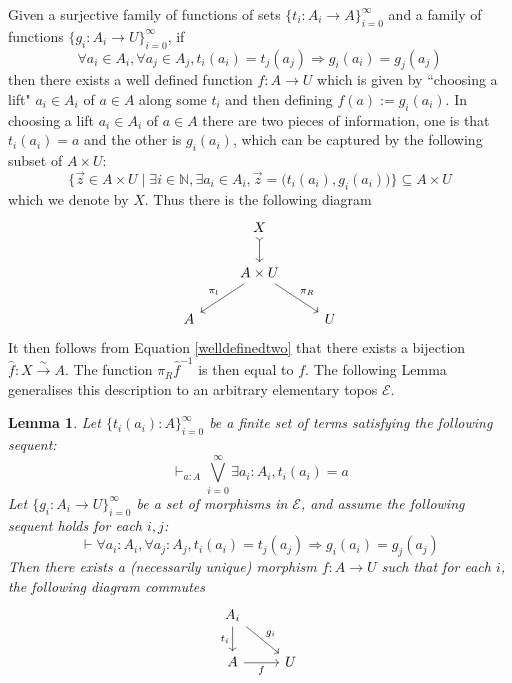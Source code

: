 \documentclass{birkjour}
\theoremstyle{plain}
\newtheorem{lemma}[thm]{Lemma}
\theoremstyle{definition}
\newcommand{\bb}[1]{\mathbb{#1}}
\newcommand{\call}[1]{\mathcal{#1}}
\begin{document}
Given a surjective family of functions of sets $\lbrace t_i: A_i \to A\rbrace_{i = 0}^\infty$ and a family of functions $\lbrace g_i: A_i \to U\rbrace_{i = 0}^\infty$, if
\begin{equation}
	\label{welldefinedtwo}
	\forall a_i \in A_i, \forall a_j \in A_j, t_i(a_i) = t_j(a_j) \Rightarrow g_i(a_i) = g_j(a_j)
\end{equation}
then there exists a well defined function $f: A \to U$ which is given by ``choosing a lift" $a_i \in A_i$ of $a \in A$ along some $t_i$ and then defining $f(a) := g_i(a_i)$. In choosing a lift $a_i \in A_i$ of $a \in A$ there are two pieces of information, one is that $t_i(a_i) = a$ and the other is $g_i(a_i)$, which can be captured by the following subset of $A \times U$:
\[\big\lbrace\vec{z} \in A \times U \mid \exists i \in \bb{N}, \exists a_i \in A_i, \vec{z} = \big(t_i(a_i),g_i(a_i)\big)\big\rbrace \subseteq A \times U\]
which we denote by $X$. Thus there is the following diagram
\[
\begin{tikzcd}
	& X\arrow[d,rightarrowtail]\\
	& A \times U\arrow[dl,swap,"{\pi_l}"]\arrow[dr,"{\pi_R}"]\\
	A & & U
\end{tikzcd}
\]
It then follows from Equation \ref{welldefinedtwo} that there exists a bijection $\hat{f}: X \stackrel{\sim}{\longrightarrow} A$. The function $\pi_R \hat{f}^{-1}$ is then equal to $f$. The following Lemma generalises this description to an arbitrary elementary topos $\call{E}$.
\begin{lemma}
	\label{functionglueingintro}
	Let $\lbrace t_i(a_i): A \rbrace_{i = 0}^\infty$ be a finite set of terms satisfying the following sequent:
	\begin{equation}
		\label{epimorphicfamily}
		\vdash_{a:A}\bigvee_{i = 0}^\infty \exists a_i: A_i, t_i(a_i) = a
	\end{equation}
	Let $\lbrace g_i: A_i \to U\rbrace_{i = 0}^\infty$ be a set of morphisms in $\call{E}$, and assume the following sequent holds for each $i,j$:
	\begin{equation}
		\label{welldefined}
		\vdash \forall a_i : A_i, \forall a_j: A_j, t_i(a_i) = t_j(a_j) \Rightarrow g_i(a_i) = g_j(a_j)
	\end{equation}
	Then there exists a (necessarily unique) morphism $f: A \to  U$ such that for each $i$, the following diagram commutes
	\[
	\begin{tikzcd}
		A_i\arrow[dr,"{g_i}"]\arrow[d,swap,"{t_i}"]\\
		A\arrow[r,swap,"f"] & U
	\end{tikzcd}
	\]
\end{lemma}
\end{document}
